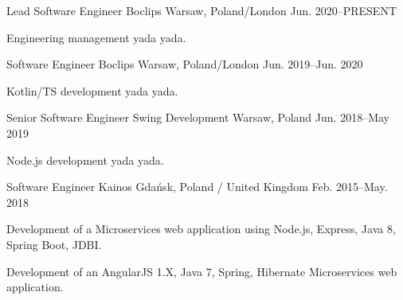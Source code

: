 
\begin{cventries}

  \cventry
    {Lead Software Engineer} %
    {Boclips} %
    {Warsaw, Poland/London} %
    {Jun. 2020–PRESENT} %
    {
      \begin{cvitems} %
        \item {Engineering management yada yada.}
      \end{cvitems}
    }

  \cventry
    {Software Engineer} %
    {Boclips} %
    {Warsaw, Poland/London} %
    {Jun. 2019–Jun. 2020} %
    {
      \begin{cvitems} %
        \item {Kotlin/TS development yada yada.}
      \end{cvitems}
    }

  \cventry
    {Senior Software Engineer} %
    {Swing Development} %
    {Warsaw, Poland} %
    {Jun. 2018–May 2019} %
    {
      \begin{cvitems} %
        \item {Node.js development yada yada.}
      \end{cvitems}
    }

  \cventry
    {Software Engineer} %
    {Kainos} %
    {Gdańsk, Poland / United Kingdom} %
    {Feb. 2015–May. 2018} %
    {
      \begin{cvitems} %
        \item {Development of a Microservices web application using Node.js, Express, Java 8, Spring Boot, JDBI.}
        \item {Development of an AngularJS 1.X, Java 7, Spring, Hibernate Microservices web application.}
      \end{cvitems}
    }


\end{cventries}
